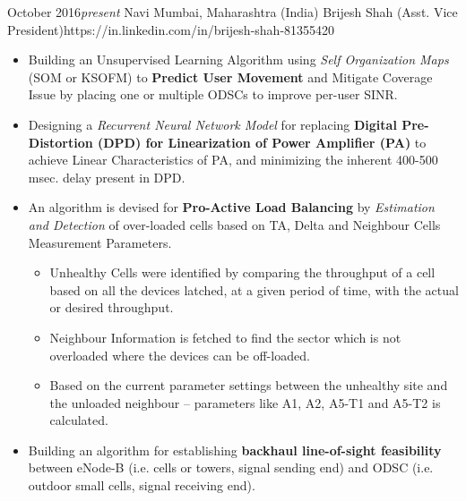 
%


	{October 2016}{\textit{present}}
	{Navi Mumbai, Maharashtra (India)}
	{Brijesh Shah (Asst. Vice President)}{https://in.linkedin.com/in/brijesh-shah-81355420}

\begin{itemize}
	\item Building an Unsupervised Learning Algorithm using \textit{Self Organization Maps} (SOM or KSOFM) to \textbf{Predict User Movement} and Mitigate Coverage Issue by placing one or multiple ODSCs to improve per-user SINR.
	
	\item Designing a \textit{Recurrent Neural Network Model} for replacing \textbf{Digital Pre-Distortion (DPD) for Linearization of Power Amplifier (PA)} to achieve Linear Characteristics of PA, and minimizing the inherent 400-500 msec. delay present in DPD.
	
	\item An algorithm is devised for \textbf{Pro-Active Load Balancing} by \textit{Estimation and Detection} of over-loaded cells based on TA, Delta and Neighbour Cells Measurement Parameters.
	
	\begin{itemize}
		\item Unhealthy Cells were identified by comparing the throughput of a cell based on all the devices latched, at a given period of time, with the actual or desired throughput.
		
		\item Neighbour Information is fetched to find the sector which is not overloaded where the devices can be off-loaded.
		
		\item Based on the current parameter settings between the unhealthy site and the unloaded neighbour – parameters like A1, A2, A5-T1 and A5-T2 is calculated.
	\end{itemize}

	\item Building an algorithm for establishing \textbf{backhaul line-of-sight feasibility} between eNode-B (i.e. cells or towers, signal sending end) and ODSC (i.e. outdoor small cells, signal receiving end).
	

\end{itemize}
